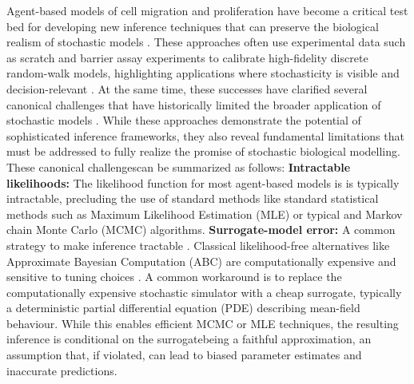 \documentclass{article}
\providecommand{\DIFaddtex}[1]{{\protect\color{blue} \sf #1}} %
\providecommand{\DIFdeltex}[1]{{\protect\color{red} \scriptsize #1}} %
\providecommand{\DIFaddbegin}{} %
\providecommand{\DIFaddend}{} %
\providecommand{\DIFdelbegin}{} %
\providecommand{\DIFdelend}{} %
\providecommand{\DIFadd}[1]{\texorpdfstring{\DIFaddtex{#1}}{#1}} %
\providecommand{\DIFdel}[1]{\texorpdfstring{\DIFdeltex{#1}}{}} %
\newcommand{\DIFscaledelfig}{0.5}
\newlength{\DIFdelgraphicswidth} %
\newlength{\DIFdelgraphicsheight} %
\newcommand{\DIFaddincludegraphics}[2][]{{\color{blue}\fbox{\DIFOincludegraphics[#1]{#2}}}} %
\newcommand{\DIFdelincludegraphics}[2][]{%
\sbox{\DIFdelgraphicsbox}{\DIFOincludegraphics[#1]{#2}}%
\settoboxwidth{\DIFdelgraphicswidth}{\DIFdelgraphicsbox} %
\settoboxtotalheight{\DIFdelgraphicsheight}{\DIFdelgraphicsbox} %
\scalebox{\DIFscaledelfig}{%
\parbox[b]{\DIFdelgraphicswidth}{\usebox{\DIFdelgraphicsbox}\\[-\baselineskip] \rule{\DIFdelgraphicswidth}{0em}}\llap{\resizebox{\DIFdelgraphicswidth}{\DIFdelgraphicsheight}{%
\setlength{\unitlength}{\DIFdelgraphicswidth}%
\begin{picture}(1,1)%
\thicklines\linethickness{2pt} %
{\color[rgb]{1,0,0}\put(0,0){\framebox(1,1){}}}%
{\color[rgb]{1,0,0}\put(0,0){\line( 1,1){1}}}%
{\color[rgb]{1,0,0}\put(0,1){\line(1,-1){1}}}%
\end{picture}%
}\hspace*{3pt}}} %
} %
\DeclareRobustCommand{\DIFaddbegin}{\DIFOaddbegin \let\includegraphics\DIFaddincludegraphics} %
\DeclareRobustCommand{\DIFaddend}{\DIFOaddend \let\includegraphics\DIFOincludegraphics} %
\DeclareRobustCommand{\DIFdelbegin}{\DIFOdelbegin \let\includegraphics\DIFdelincludegraphics} %
\DeclareRobustCommand{\DIFdelend}{\DIFOaddend \let\includegraphics\DIFOincludegraphics} %
\begin{document}
\DIFdel{Agent-based models of cell migration and proliferation have become a critical test bed for developing new inference techniques that can preserve the biological realism of stochastic models \citep{Carr2021,SIMPSON2022111201,Simpson2025.05.25.656057,Ross2017ABCadhesion,Warne2022RapidBayes,Liu2024PRE,Lagergren2020BINN,Nardini2023BINNForecast}. These approaches often use experimental data such as scratch and barrier assay experiments to calibrate high-fidelity discrete random-walk models, highlighting applications where stochasticity is visible and decision-relevant \citep{Jin2016ScratchRepro,Johnston2014LeadingEdgeInfo,Simpson2013CircularBarrier}. At the same time, these successes have clarified several canonical challenges that have historically limited the broader application of stochastic models \citep{Liu2024PRE,Warne2022RapidBayes}. While these approaches demonstrate the potential of sophisticated inference frameworks, they also reveal fundamental limitations that must be addressed to fully realize the promise of stochastic biological modelling. These canonical challengescan be summarized as follows: 
}%
\DIFdel{\textbf{Intractable likelihoods:} }\DIFdelend The likelihood function \DIFdelbegin \DIFdel{for most agent-based models is }\DIFdelend \DIFaddbegin \DIFadd{is typically }\DIFaddend intractable, precluding \DIFdelbegin \DIFdel{the use of standard methods like }\DIFdelend \DIFaddbegin \DIFadd{standard statistical methods such as }\DIFaddend Maximum Likelihood Estimation (MLE) \DIFdelbegin \DIFdel{or typical }\DIFdelend \DIFaddbegin \DIFadd{and }\DIFaddend Markov chain Monte Carlo (MCMC)\DIFdelbegin \DIFdel{algorithms. }%
\DIFdel{\textbf{Surrogate-model error:} A common strategy to make inference tractable }\DIFdelend \DIFaddbegin \DIFadd{. Classical likelihood-free alternatives like Approximate Bayesian Computation (ABC) are computationally expensive and sensitive to tuning choices \citep{SunnkerABC,Sisson2018}. A common workaround }\DIFaddend is to replace the \DIFdelbegin \DIFdel{computationally expensive }\DIFdelend stochastic simulator with a \DIFdelbegin \DIFdel{cheap surrogate, typically a }\DIFdelend deterministic partial differential equation (PDE) \DIFdelbegin \DIFdel{describing mean-field behaviour. While this enables efficient MCMC or MLE techniques, the resulting inference is conditional on the surrogatebeing a faithful approximation, an assumption that, if violated, can lead to biased parameter estimates and inaccurate predictions. 
	}%
\end{document}
